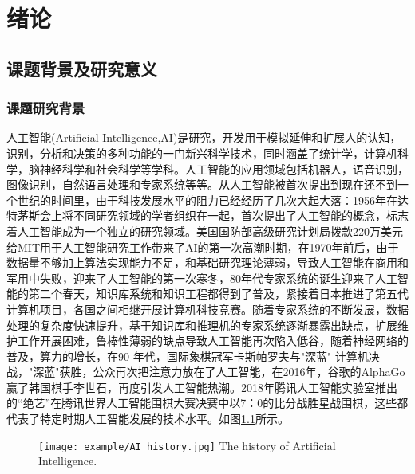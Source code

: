 \chapter{绪论}
\section{课题背景及研究意义}
\subsection{课题研究背景}
人工智能(Artificial Intelligence,AI)是研究，开发用于模拟延伸和扩展人的认知，识别，分析和决策的多种功能的一门新兴科学技术，同时涵盖了统计学，计算机科学，脑神经科学和社会科学等学科。人工智能的应用领域包括机器人，语音识别，图像识别，自然语言处理和专家系统等等。从人工智能被首次提出到现在还不到一个世纪的时间里，由于科技发展水平的阻力已经经历了几次大起大落：1956年在达特茅斯会上将不同研究领域的学者组织在一起，首次提出了人工智能的概念，标志着人工智能成为一个独立的研究领域。美国国防部高级研究计划局拨款220万美元给MIT用于人工智能研究工作带来了AI的第一次高潮时期，在1970年前后，由于数据量不够加上算法实现能力不足，和基础研究理论薄弱，导致人工智能在商用和军用中失败，迎来了人工智能的第一次寒冬，80年代专家系统的诞生迎来了人工智能的第二个春天，知识库系统和知识工程都得到了普及，紧接着日本推进了第五代计算机项目，各国之间相继开展计算机科技竞赛。随着专家系统的不断发展，数据处理的复杂度快速提升，基于知识库和推理机的专家系统逐渐暴露出缺点，扩展维护工作开展困难，鲁棒性薄弱的缺点导致人工智能再次陷入低谷，随着神经网络的普及，算力的增长，在90 年代，国际象棋冠军卡斯帕罗夫与"深蓝" 计算机决战，"深蓝"获胜，公众再次把注意力放在了人工智能，在2016年，谷歌的AlphaGo赢了韩国棋手李世石，再度引发人工智能热潮。2018年腾讯人工智能实验室推出的“绝艺”在腾讯世界人工智能围棋大赛决赛中以7：0的比分战胜星战围棋\cite{人工智能产业形势分析课题组20182018}，这些都代表了特定时期人工智能发展的技术水平。如图\ref{fig:人工智能发展历史图况}所示。

\begin{figure}[htb]
	\centering
	\texttt{[image: example/AI\_history.jpg]}
	{The history of Artificial Intelligence.}
	\label{fig:人工智能发展历史图况}
\end{figure}

